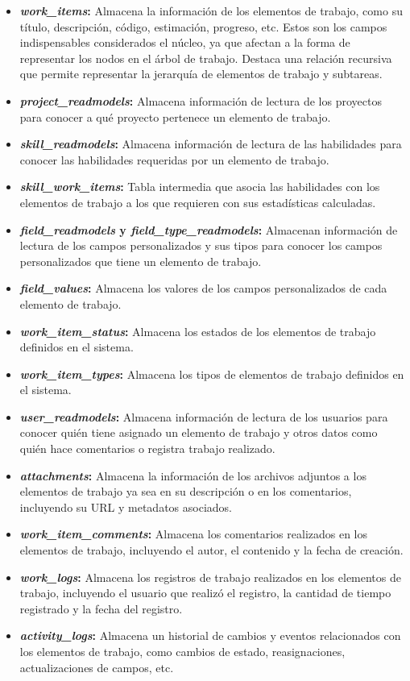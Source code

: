 \begin{itemize}
    \item \textbf{\emph{work\_items}:} Almacena la información de los elementos de trabajo, como su título, descripción, código, estimación, progreso, etc. Estos son los campos indispensables considerados el núcleo, ya que afectan a la forma de representar los nodos en el árbol de trabajo. Destaca una relación recursiva que permite representar la jerarquía de elementos de trabajo y subtareas.
    \item \textbf{\emph{project\_readmodels}:} Almacena información de lectura de los proyectos para conocer a qué proyecto pertenece un elemento de trabajo.
    \item \textbf{\emph{skill\_readmodels}:} Almacena información de lectura de las habilidades para conocer las habilidades requeridas por un elemento de trabajo.
    \item \textbf{\emph{skill\_work\_items}:} Tabla intermedia que asocia las habilidades con los elementos de trabajo a los que requieren con sus estadísticas calculadas.
    \item \textbf{\emph{field\_readmodels} y \emph{field\_type\_readmodels}:} Almacenan información de lectura de los campos personalizados y sus tipos para conocer los campos personalizados que tiene un elemento de trabajo.
    \item \textbf{\emph{field\_values}:} Almacena los valores de los campos personalizados de cada elemento de trabajo.
    \item \textbf{\emph{work\_item\_status}:} Almacena los estados de los elementos de trabajo definidos en el sistema.
    \item \textbf{\emph{work\_item\_types}: } Almacena los tipos de elementos de trabajo definidos en el sistema.
    \item \textbf{\emph{user\_readmodels}:} Almacena información de lectura de los usuarios para conocer quién tiene asignado un elemento de trabajo y otros datos como quién hace comentarios o registra trabajo realizado.
    \item \textbf{\emph{attachments}:} Almacena la información de los archivos adjuntos a los elementos de trabajo ya sea en su descripción o en los comentarios, incluyendo su URL y metadatos asociados.
    \item \textbf{\emph{work\_item\_comments}:} Almacena los comentarios realizados en los elementos de trabajo, incluyendo el autor, el contenido y la fecha de creación.
    \item \textbf{\emph{work\_logs}:} Almacena los registros de trabajo realizados en los elementos de trabajo, incluyendo el usuario que realizó el registro, la cantidad de tiempo registrado y la fecha del registro.
    \item \textbf{\emph{activity\_logs}:} Almacena un historial de cambios y eventos relacionados con los elementos de trabajo, como cambios de estado, reasignaciones, actualizaciones de campos, etc.
\end{itemize}

